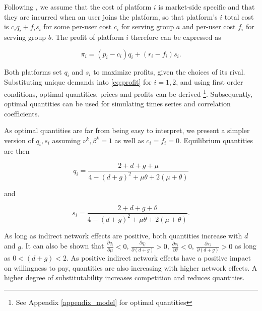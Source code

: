 \documentclass[12pt,a4paper]{scrreprt}
\begin{document}
Following \cite{armstrong_competition_2006}, we assume that the cost of platform $i$ is market-side specific and that they are incurred when an user joins the platform, so that platform's $i$ total cost is $c_i q_i+f_i s_i$ for some per-user cost $c_i$ for serving group $a$ and per-user cost $f_i$ for serving group $b$. The profit of platform $i$ therefore can be expressed as 

\begin{equation}\label{eq:profit}
\pi_i=(p_i-c_i)q_i+(r_i-f_i)s_i.
\end{equation}

Both platforms set $q_i$ and $s_i$ to maximize profits, given the choices of its rival. Substituting unique demands into \ref{eq:profit} for $i=1,2$, and using first order conditions, optimal quantities, prices and profits can be derived \footnote{See Appendix \ref{appendix_model} for optimal quantities}. Subsequently, optimal quantities can be used for simulating times series and correlation coefficients. 


 As optimal quantities are far from being easy to interpret, we present a simpler version of $q_i, s_i$ assuming $\nu^k, \beta^k=1$  as well as $c_i=f_i=0$. Equilibrium quantities are then

\begin{equation}\label{eq_quantities1}
	q_i=\frac{2+d+g+\mu}{4-(d+g)^2+\mu\theta+2(\mu+\theta)}
\end{equation}

and

\begin{equation}\label{eq_quantities2}
	s_i=\frac{2+d+g+\theta}{4-(d+g)^2+\mu\theta+2(\mu+\theta)}.
\end{equation}

As long as indirect network effects are positive, both quantities increase with $d$ and $g$. It can also be shown that $\frac{\partial q_i}{\partial \mu}<0$, $\frac{\partial q_i}{\partial (d+g)}>0$, $\frac{\partial s_i}{\partial \theta}<0$, $\frac{\partial s_i}{\partial (d+g)}>0$ as long as $0<(d+g)<2$. As positive indirect network effects have a positive impact on willingness to pay, quantities are also increasing with higher network effects. A higher degree of substitutability increases competition and reduces quantities.  

\end{document}
